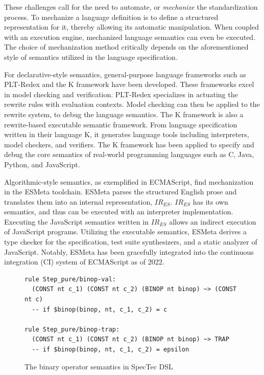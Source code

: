These challenges call for the need to automate, or \textit{mechanize} the standardization process. 
To mechanize a language definition is to define a structured representation for it, thereby allowing its automatic manipulation. 
When coupled with an execution engine, mechanized language semantics can even be executed. 
The choice of mechanization method critically depends on the aforementioned style of semantics utilized in the language specification.

For declarative-style semantics, general-purpose language frameworks such as PLT-Redex and the K framework have been developed. 
These frameworks excel in model checking and verification. 
PLT-Redex specializes in actuating the rewrite rules with evaluation contexts. 
Model checking can then be applied to the rewrite system, to debug the language semantics. 
The K framework is also a rewrite-based executable semantic framework. 
From language specification written in their language K, it generates language tools including interpreters, model checkers, and verifiers.
The K framework has been applied to specify and debug the core semantics of real-world programming languages such as C, Java, Python, and JavaScript.

Algorithmic-style semantics, as exemplified in ECMAScript, find mechanization in the ESMeta toolchain. 
ESMeta parses the structured English prose and translates them into an internal representation, $IR_{ES}$. 
$IR_{ES}$ has its own semantics, and thus can be executed with an interpreter implementation. 
Executing the JavaScript semantics written in $IR_{ES}$ allows an indirect execution of JavaScript programs. 
Utilizing the executable semantics, ESMeta derives a type checker for the specification, test suite synthesizers, and a static analyzer of JavaScript. 
Notably, ESMeta has been gracefully integrated into the continuous integration (CI) system of ECMAScript as of 2022.

\begin{figure}[t]
\footnotesize
\begin{verbatim}
rule Step_pure/binop-val:
  (CONST nt c_1) (CONST nt c_2) (BINOP nt binop) ~> (CONST nt c)
  -- if $binop(binop, nt, c_1, c_2) = c

rule Step_pure/binop-trap:
  (CONST nt c_1) (CONST nt c_2) (BINOP nt binop) ~> TRAP
  -- if $binop(binop, nt, c_1, c_2) = epsilon
\end{verbatim}
\caption{The binary operator semantics in SpecTec DSL}
\label{fig:dsl}
\end{figure}

